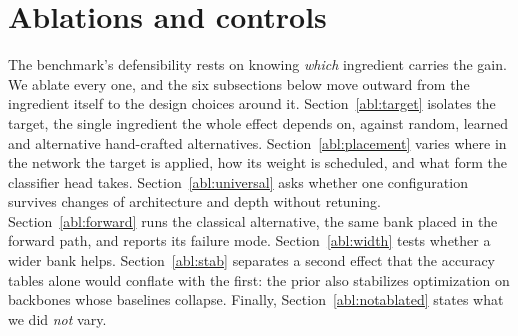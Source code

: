 \section{Ablations and controls}\label{sec:ablations}

The benchmark's defensibility rests on knowing \emph{which} ingredient
carries the gain. We ablate every one, and the six subsections below move
outward from the ingredient itself to the design choices around it.
Section~\ref{abl:target} isolates the target, the single ingredient the
whole effect depends on, against random, learned and alternative
hand-crafted alternatives. Section~\ref{abl:placement} varies where in
the network the target is applied, how its weight is scheduled, and what
form the classifier head takes. Section~\ref{abl:universal} asks whether
one configuration survives changes of architecture and depth without
retuning. Section~\ref{abl:forward} runs the classical alternative, the
same bank placed in the forward path, and reports its failure mode.
Section~\ref{abl:width} tests whether a wider bank helps.
Section~\ref{abl:stab} separates a second effect that the accuracy
tables alone would conflate with the first: the prior also stabilizes
optimization on backbones whose baselines collapse. Finally,
Section~\ref{abl:notablated} states what we did \emph{not} vary.

